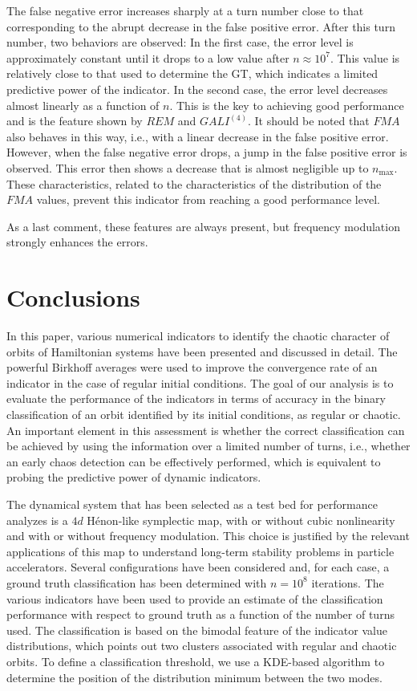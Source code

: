 The false negative error increases sharply at a turn number close to that corresponding to the abrupt decrease in the false positive error. After this turn number, two behaviors are observed: In the first case, the error level is approximately constant until it drops to a low value after $n \approx 10^7$. This value is relatively close to that used to determine the GT, which indicates a limited predictive power of the indicator. In the second case, the error level decreases almost linearly as a function of $n$. This is the key to achieving good performance and is the feature shown by $REM$ and $GALI^{(4)}$. It should be noted that $FMA$ also behaves in this way, i.e., with a linear decrease in the false positive error. However, when the false negative error drops, a jump in the false positive error is observed. This error then shows a decrease that is almost negligible up to $n_\mathrm{max}$. These characteristics, related to the characteristics of the distribution of the $FMA$ values, prevent this indicator from reaching a good performance level. 

As a last comment, these features are always present, but frequency modulation strongly enhances the errors. 
%
\section{\label{sec:dyn:conc} Conclusions}
%
In this paper, various numerical indicators to identify the chaotic character of orbits of Hamiltonian systems have been presented and discussed in detail. The powerful Birkhoff averages were used to improve the convergence rate of an indicator in the case of regular initial conditions. The goal of our analysis is to evaluate the performance of the indicators in terms of accuracy in the binary classification of an orbit identified by its initial conditions, as regular or chaotic. An important element in this assessment is whether the correct classification can be achieved by using the information over a limited number of turns, i.e., whether an early chaos detection can be effectively performed, which is equivalent to probing the predictive power of dynamic indicators. 

The dynamical system that has been selected as a test bed for performance analyzes is a $4d$ H\'enon-like symplectic map, with or without cubic nonlinearity and with or without frequency modulation. This choice is justified by the relevant applications of this map to understand long-term stability problems in particle accelerators. Several configurations have been considered and, for each case, a ground truth classification has been determined with $n=10^8$ iterations. The various indicators have been used to provide an estimate of the classification performance with respect to ground truth as a function of the number of turns used. The classification is based on the bimodal feature of the indicator value distributions, which points out two clusters associated with regular and chaotic orbits. To define a classification threshold, we use a KDE-based algorithm to determine the position of the distribution minimum between the two modes.

